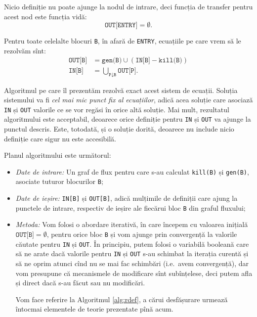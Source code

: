 Nicio definiție nu poate ajunge la nodul de intrare, deci funcția
de transfer pentru acest nod este funcția vidă:
\[
    \texttt{OUT[ENTRY]} = \emptyset.
\]

Pentru toate celelalte blocuri \texttt{B}, în afară de \texttt{ENTRY},
ecuațiile pe care vrem să le rezolvăm sînt:
\begin{align*}
    \texttt{OUT[B]} &= \texttt{gen(B)} \cup (\texttt{IN[B]} - \texttt{kill(B)}) \\
    \texttt{IN[B]} &= \bigcup_{\texttt{P} \downarrow \texttt{B}} \texttt{OUT[P]}.
\end{align*}

Algoritmul pe care îl prezentăm rezolvă exact acest sistem de ecuații.
Soluția sistemului va fi \emph{cel mai mic punct fix al ecuațiilor}, adică
acea soluție care asociază \texttt{IN} și \texttt{OUT} valorile ce se vor
regăsi în orice altă soluție. Mai mult, rezultatul algoritmului
este acceptabil, deoarece orice definiție pentru \texttt{IN} și \texttt{OUT}
va ajunge la punctul descris. Este, totodată, și o soluție dorită,
deoarece nu include nicio definiție care sigur nu este accesibilă.

Planul algoritmului este următorul:
\begin{itemize}
    \item \emph{Date de intrare:} Un graf de flux pentru care s-au calculat
        \texttt{kill(B)} și \texttt{gen(B)}, asociate tuturor blocurilor \texttt{B};
    \item \emph{Date de ieșire:} \texttt{IN[B]} și \texttt{OUT[B]}, adică
        mulțimile de definiții care ajung la punctele de intrare, respectiv de ieșire
        ale fiecărui bloc \texttt{B} din graful fluxului;
    \item \emph{Metoda:} Vom folosi o abordare iterativă, în care începem
        cu valoarea inițială $ \texttt{OUT[B]} = \emptyset $, pentru orice bloc \texttt{B}
        și vom ajunge prin convergență la valorile căutate pentru \texttt{IN} și \texttt{OUT}.
        În principiu, putem folosi o variabilă booleană care să ne arate dacă valorile
        pentru \texttt{IN} și \texttt{OUT} s-au schimbat la iterația curentă și să ne
        oprim atunci cînd nu se mai fac schimbări (i.e.\ avem convergență), dar vom
        presupune că mecanismele de modificare sînt subînțelese, deci putem afla
        și direct dacă s-au făcut sau nu modificări.

        Vom face referire la Algoritmul \ref{alg:rdef}, a cărui desfășurare urmează
        întocmai elementele de teorie prezentate pînă acum.
\end{itemize}

